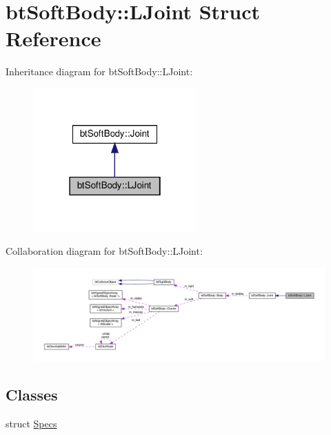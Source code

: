 \hypertarget{structbtSoftBody_1_1LJoint}{}\section{bt\+Soft\+Body\+:\+:L\+Joint Struct Reference}
\label{structbtSoftBody_1_1LJoint}


Inheritance diagram for bt\+Soft\+Body\+:\+:L\+Joint\+:
\nopagebreak
\begin{figure}[H]
\begin{center}
\leavevmode
\includegraphics[width=178pt]{structbtSoftBody_1_1LJoint__inherit__graph}
\end{center}
\end{figure}


Collaboration diagram for bt\+Soft\+Body\+:\+:L\+Joint\+:
\nopagebreak
\begin{figure}[H]
\begin{center}
\leavevmode
\includegraphics[width=350pt]{structbtSoftBody_1_1LJoint__coll__graph}
\end{center}
\end{figure}
\subsection*{Classes}
\begin{DoxyCompactItemize}
\item 
struct \hyperlink{structbtSoftBody_1_1LJoint_1_1Specs}{Specs}
\end{DoxyCompactItemize}
